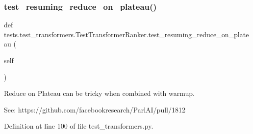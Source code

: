 \subsubsection{\texorpdfstring{test\+\_\+resuming\+\_\+reduce\+\_\+on\+\_\+plateau()}{test\_resuming\_reduce\_on\_plateau()}}
{\footnotesize\ttfamily def tests.\+test\+\_\+transformers.\+Test\+Transformer\+Ranker.\+test\+\_\+resuming\+\_\+reduce\+\_\+on\+\_\+plateau (\begin{DoxyParamCaption}\item[{}]{self }\end{DoxyParamCaption})}

\begin{DoxyVerb}Reduce on Plateau can be tricky when combined with warmup.

See: https://github.com/facebookresearch/ParlAI/pull/1812
\end{DoxyVerb}
 

Definition at line 100 of file test\+\_\+transformers.\+py.


